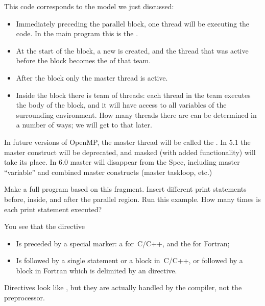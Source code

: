 This code corresponds to the model we just discussed:
\begin{itemize}
\item Immediately preceding the parallel block, one thread will be
  executing the code.
  In the main program this is the .
\item At the start of the block, a new  is
  created, and the thread that was active before the block
  becomes the  of that team.
\item After the block only the master thread is active.
\item Inside the block there is team of threads: each thread in the
  team executes the body of the block, and it will have access to all
  variables of the surrounding environment.
  How many
  threads there are can be determined in a number of ways; we will get to that later.
\end{itemize}

\begin{remark}
  In future versions of OpenMP, the master thread will be called
  the .
  In 5.1 the master construct will be deprecated, and masked (with
  added functionality) will take its place.  In 6.0 master will
  disappear from the Spec, including  master “variable”
  and combined master constructs (master taskloop, etc.)
\end{remark}

\begin{exercise}
  Make a full program based on this fragment. Insert different print statements
  before, inside, and after the parallel region.
  Run this example. How many times is each print statement executed?
\end{exercise}

You see that the  directive
\begin{itemize}
\item Is preceded by a special marker: a  for~C/C++,
  and the   for Fortran;
\item Is followed by a single statement or a block in~C/C++,
  or followed by a block in Fortran which is delimited by an  directive.
\end{itemize}

Directives look like , but they
are actually handled by the compiler, not the preprocessor.

